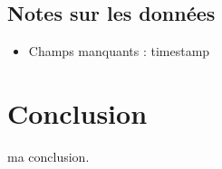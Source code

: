 \subsection{Notes sur les données}
\begin{itemize}
	\item Champs manquants : timestamp
\end{itemize}
\section{Conclusion}
ma conclusion.